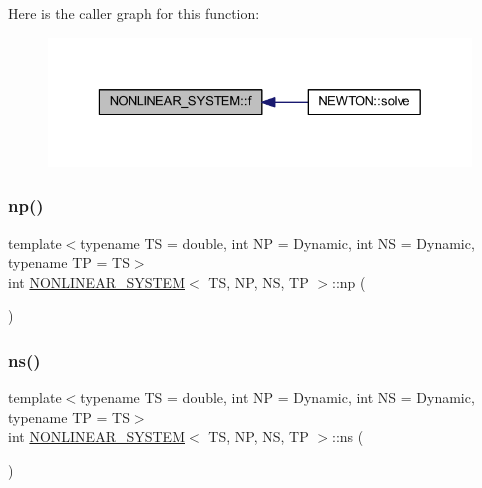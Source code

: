 Here is the caller graph for this function\+:\nopagebreak
\begin{figure}[H]
\begin{center}
\leavevmode
\includegraphics[width=329pt]{class_n_o_n_l_i_n_e_a_r___s_y_s_t_e_m_a65827d7df297f26cd3f14f472a212077_icgraph}
\end{center}
\end{figure}
\mbox{\label{class_n_o_n_l_i_n_e_a_r___s_y_s_t_e_m_ab5876470030832088d8ee1ed609d5311}} 
\subsubsection{\texorpdfstring{np()}{np()}}
{\footnotesize\ttfamily template$<$typename TS = double, int NP = Dynamic, int NS = Dynamic, typename TP = TS$>$ \\
int \mbox{\hyperlink{class_n_o_n_l_i_n_e_a_r___s_y_s_t_e_m}{N\+O\+N\+L\+I\+N\+E\+A\+R\+\_\+\+S\+Y\+S\+T\+EM}}$<$ TS, NP, NS, TP $>$\+::np (\begin{DoxyParamCaption}{ }\end{DoxyParamCaption})\hspace{0.3cm}{\ttfamily [inline]}}

\mbox{\label{class_n_o_n_l_i_n_e_a_r___s_y_s_t_e_m_abf4102c649f8316e44033a76f9d6183f}} 
\subsubsection{\texorpdfstring{ns()}{ns()}}
{\footnotesize\ttfamily template$<$typename TS = double, int NP = Dynamic, int NS = Dynamic, typename TP = TS$>$ \\
int \mbox{\hyperlink{class_n_o_n_l_i_n_e_a_r___s_y_s_t_e_m}{N\+O\+N\+L\+I\+N\+E\+A\+R\+\_\+\+S\+Y\+S\+T\+EM}}$<$ TS, NP, NS, TP $>$\+::ns (\begin{DoxyParamCaption}{ }\end{DoxyParamCaption})\hspace{0.3cm}{\ttfamily [inline]}}

